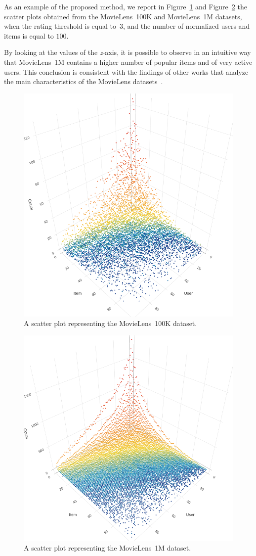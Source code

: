 As an example of the proposed method, we report in Figure~\ref{viz:fig:ml-100k} and Figure~\ref{viz:fig:ml-1m} the scatter plots obtained from the MovieLens~100K and MovieLens~1M datasets, when the rating threshold is equal to~$3$, and the number of normalized users and items is equal to $100$.

By looking at the values of the \textit{z}-axis, it is possible to observe in an intuitive way that MovieLens~1M contains a higher number of popular items and of very active users. This conclusion is consistent with the findings of other works that analyze the main characteristics of the MovieLens datasets~\cite{Cremonesi2010}.

\begin{figure}
\centering
\includegraphics[width=.75\textwidth]{ml-100k}
\caption[Scatter plot of MovieLens~100K]{A scatter plot representing the MovieLens~100K dataset.}
\label{viz:fig:ml-100k}
\end{figure}

\begin{figure}
\centering
\includegraphics[width=.75\textwidth]{ml-1m}
\caption[Scatter plot of MovieLens~1M]{A scatter plot representing the MovieLens~1M dataset.}
\label{viz:fig:ml-1m}
\end{figure}

